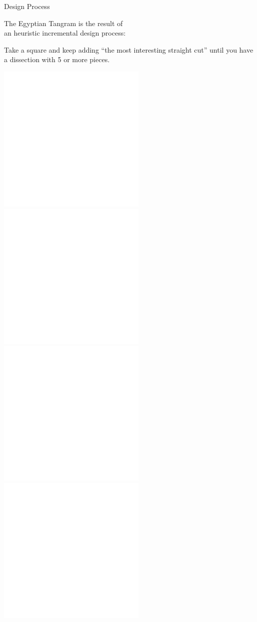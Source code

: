 \documentclass[14pt]{beamer}
\begin{document}

    \begin{frame}{Design Process}
        \begin{center}
            The Egyptian Tangram is the result of\\an heuristic incremental design process:

            \bigskip

            {\small Take a square and keep adding ``the most interesting straight cut'' until you have a dissection with 5 or more pieces.}

            \bigskip \bigskip


            \includegraphics[height=10ex]{figures/figure001e.pdf} \quad \includegraphics[height=10ex]{figures/figure001d.pdf} \quad \includegraphics[height=10ex]{figures/figure001c.pdf} \quad \includegraphics[height=10ex]{figures/figure001b.pdf} \\
        \end{center}
    \end{frame}

\end{document}
